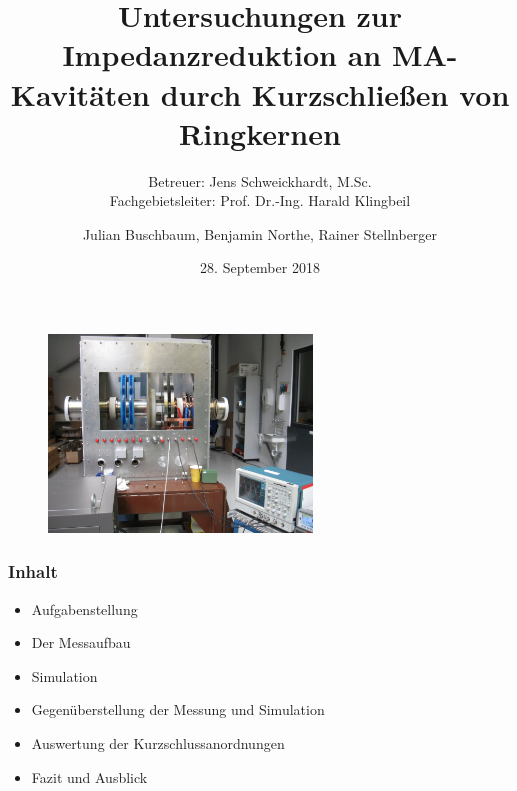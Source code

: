 \documentclass[accentcolor=tud9b, colorbacktitle, inverttitle]{tudbeamer}
\author{Julian Buschbaum, Benjamin Northe, Rainer Stellnberger}
\institute{Institut TEMF~\textbar~Fachgebiet Beschleunigertechnik}
\date{28. September 2018}
\title{Untersuchungen zur Impedanzreduktion an MA-Kavitäten durch Kurzschließen von Ringkernen \vspace{0.2em}}
\subtitle{Betreuer: Jens Schweickhardt, M.Sc.\\ Fachgebietsleiter: Prof. Dr.-Ing. Harald Klingbeil}
\begin{document}

\begin{titleframe}
\vspace{-1em}
	\begin{figure}[h]
		\centering
		\includegraphics[width=0.625\textwidth]{Kavitaet}
	\end{figure}
\end{titleframe}




\begin{frame}\frametitle{Inhalt}
	\begin{itemize}
		\item Aufgabenstellung
		\item Der Messaufbau
		\item Simulation
		\item Gegen\"uberstellung der Messung und Simulation
		\item Auswertung der Kurzschlussanordnungen
		\item Fazit und Ausblick
	\end{itemize}
\end{frame}
\end{document}
